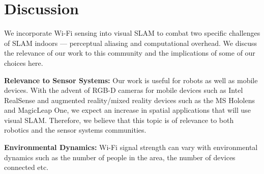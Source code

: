 \vspace{-5pt}
\section{Discussion}\label{sec:discussion}
We incorporate Wi-Fi sensing into visual SLAM to combat two specific challenges of SLAM indoors --- perceptual aliasing and computational overhead. 
We discuss the relevance of our work to this community and the implications of some of our choices here.




{\bf Relevance to Sensor Systems:} Our work is useful for robots as well as mobile devices. 
With the advent of RGB-D cameras for mobile devices such as Intel RealSense and augmented reality/mixed reality devices such as the MS Hololens and MagicLeap One, we expect an increase in spatial applications that will use visual SLAM. Therefore, we believe that this topic is of relevance to both robotics and the sensor systems communities. 

{\bf Environmental Dynamics:} Wi-Fi signal strength can vary with environmental dynamics  such as the number of people in the area, the number of devices connected etc.

